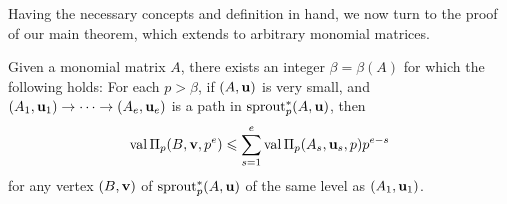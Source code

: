 \documentclass[11pt]{amsart}
\begin{document}
Having the necessary concepts and definition in hand, we now turn to the proof of our main theorem, which extends  to arbitrary monomial matrices. 

\begin{lemma}\label{lem: upper bound for higher mu}
   Given a monomial matrix $A$, there exists an integer $\beta= \beta(A)$ for which the following holds\textup:
   For each $p>\beta$, if $(A, \mathbf{u})$ is very small, and $(A_1, \mathbf{u}_1) \to \cdots \to (A_e, \mathbf{u}_e)$ is a path in $\operatorname{sprout}^{\ast}_p(A,\mathbf{u})$,  then
   \[
      \operatorname{val} \Pi_p(B, \mathbf{v}, p^e) \leqslant \sum_{s=1}^e \operatorname{val} \Pi_p(A_s, \mathbf{u}_s, p)p^{e-s}
   \]
   for any vertex $(B, \mathbf{v})$ of $\operatorname{sprout}^{\ast}_p(A,\mathbf{u})$ of the same level as $(A_1, \mathbf{u}_1)$.
\end{lemma}
\end{document}
